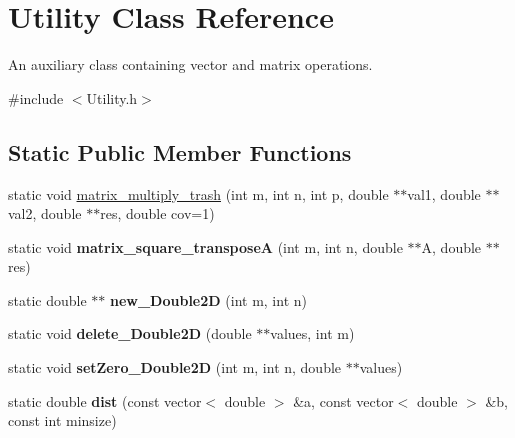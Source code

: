 \hypertarget{classUtility}{\section{Utility Class Reference}
\label{classUtility}
}


An auxiliary class containing vector and matrix operations.  




{\ttfamily \#include $<$Utility.\-h$>$}

\subsection*{Static Public Member Functions}
\begin{DoxyCompactItemize}
\item 
static void \hyperlink{classUtility_ac9e89b5c673c2627420dcbf32bb1b5e9}{matrix\-\_\-multiply\-\_\-trash} (int m, int n, int p, double $\ast$$\ast$val1, double $\ast$$\ast$val2, double $\ast$$\ast$res, double cov=1)
\item 
\hypertarget{classUtility_a82fddb538f1c8dcb70ef50e98485e198}{static void {\bfseries matrix\-\_\-square\-\_\-transpose\-A} (int m, int n, double $\ast$$\ast$A, double $\ast$$\ast$res)}\label{classUtility_a82fddb538f1c8dcb70ef50e98485e198}

\item 
\hypertarget{classUtility_a149942221766edc56c991eca98b8c1ff}{static double $\ast$$\ast$ {\bfseries new\-\_\-\-Double2\-D} (int m, int n)}\label{classUtility_a149942221766edc56c991eca98b8c1ff}

\item 
\hypertarget{classUtility_a5dd57a755ed7d9644fcf248ca48ba64c}{static void {\bfseries delete\-\_\-\-Double2\-D} (double $\ast$$\ast$values, int m)}\label{classUtility_a5dd57a755ed7d9644fcf248ca48ba64c}

\item 
\hypertarget{classUtility_a8a9ab2f4c25f659b8529d8cd5ae9a833}{static void {\bfseries set\-Zero\-\_\-\-Double2\-D} (int m, int n, double $\ast$$\ast$values)}\label{classUtility_a8a9ab2f4c25f659b8529d8cd5ae9a833}

\item 
\hypertarget{classUtility_a4768fa6de97ffe6f809bc1cd7dd61736}{static double {\bfseries dist} (const vector$<$ double $>$ \&a, const vector$<$ double $>$ \&b, const int minsize)}\label{classUtility_a4768fa6de97ffe6f809bc1cd7dd61736}

\end{DoxyCompactItemize}


